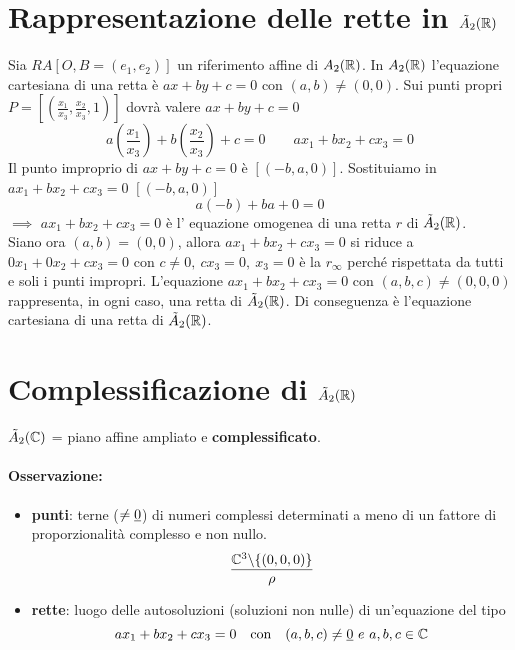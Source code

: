 \documentclass{report}
\begin{document}
\section{Rappresentazione delle rette in \(\tilde{A}_{2}(\RR) \)}
Sia \(RA [O, B = (e_1, e_2)]\) un riferimento affine di \(A_{2}(\RR) \). In \(A_{2}(\RR) \) l'equazione cartesiana di una retta è \(ax+by+c = 0\) con \((a,b) \neq (0,0)\). Sui punti propri \(P = \left[ \left( \frac{x_1}{x_3}, \frac{x_2}{x_3}, 1 \right)  \right] \) dovrà valere \(ax+by+c = 0\)\[
a \left( \frac{x_1}{x_3} \right) + b \left( \frac{x_2}{x_3} \right) + c = 0 \qquad ax_1+ bx_2+ cx_3=0
\] Il punto improprio di \(ax+by+c=0\) è \([(-b, a, 0)]\). Sostituiamo in \(ax_1+ bx_2+ cx_3=0\) \([(-b, a, 0)]\) \[
a(-b) + b a + 0 = 0
\] \(\implies \) \(ax_1+ bx_2+ cx_3=0\) è l' equazione omogenea di una retta \(r\) di \(\tilde{A}_{2}(\RR) \). \\
Siano ora \((a,b) = (0,0)\), allora \(ax_1+ bx_2+ cx_3=0\) si riduce a \(0 x_1+0x_2+cx_3=0\) con \(c \neq 0, \ cx_3 = 0, \ x_3 = 0\) è la \(r_{\infty}\) perché rispettata da tutti e soli i punti impropri. 
L'equazione \(ax_1+bx_2+cx_3= 0\) con \((a,b,c) \neq (0,0,0)\) rappresenta, in ogni caso, una retta di \(\tilde{A}_{2}(\RR) \). Di conseguenza è l'equazione cartesiana di una retta di \(\tilde{A}_{2}(\RR)\).

\section{Complessificazione di \(\tilde{A}_{2}(\RR) \)}

\(\tilde{A}_{2}(\CC)\) = piano affine ampliato e \textbf{complessificato}.
\paragraph{Osservazione:} 
\begin{itemize}
    \item \textbf{punti}: terne (\(\neq \underline{0} \)) di numeri complessi determinati a meno di un fattore di proporzionalità complesso e non nullo.
\[
\frac{\CC^{3}\backslash \{(0,0,0)\} }{\rho }
\] 
    \item \textbf{rette}: luogo delle autosoluzioni (soluzioni non nulle) di un'equazione del tipo \[
    ax_1+bx_2+cx_3= 0 \quad \text{con} \quad (a,b,c) \neq \ul{0} \ e \ a,b,c \in \CC
    \] 
\end{itemize}

\end{document}
